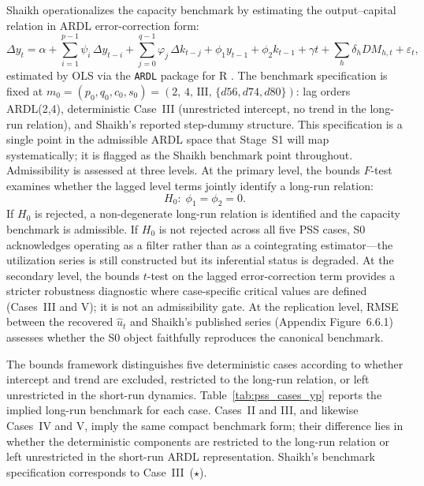 \documentclass[11pt,a4paper]{article}
\begin{document}

Shaikh operationalizes the capacity benchmark by estimating the
output--capital relation in ARDL error-correction form:
%
\begin{equation}
	\label{eq:S0_ecm}
	\Delta y_t
	=
	\alpha
	+ \sum_{i=1}^{p-1} \psi_i\,\Delta y_{t-i}
	+ \sum_{j=0}^{q-1} \varphi_j\,\Delta k_{t-j}
	+ \phi_1 y_{t-1}
	+ \phi_2 k_{t-1}
	+ \gamma t
	+ \sum_h \delta_h DM_{h,t}
	+ \varepsilon_t,
\end{equation}
%
estimated by OLS via the \texttt{ARDL} package for \textsf{R}
\citep{Natsiopoulos2024}. The benchmark specification is fixed at
$m_0 = (p_0, q_0, c_0, s_0) = (2,\, 4,\, \text{III},\, \{d56, d74, d80\})$:
lag orders ARDL(2,4), deterministic Case~III (unrestricted intercept, no
trend in the long-run relation), and Shaikh's reported step-dummy structure.
This specification is a single point in the admissible ARDL space that
Stage~S1 will map systematically; it is flagged as the Shaikh benchmark
point throughout. Admissibility is assessed at three levels. At the primary
level, the bounds $F$-test examines whether the lagged level terms jointly
identify a long-run relation:
%
\begin{equation}
	\label{eq:S0_admissibility}
	H_0:\; \phi_1 = \phi_2 = 0.
\end{equation}
%
If $H_0$ is rejected, a non-degenerate long-run relation is identified and
the capacity benchmark is admissible. If $H_0$ is not rejected across all
five PSS cases, S0 acknowledges operating as a filter rather than as a
cointegrating estimator---the utilization series is still constructed but
its inferential status is degraded. At the secondary level, the bounds
$t$-test on the lagged error-correction term provides a stricter robustness
diagnostic where case-specific critical values are defined (Cases~III and
V); it is not an admissibility gate. At the replication level, RMSE
between the recovered $\widehat{u}_t$ and Shaikh's published series
(Appendix Figure~6.6.1) assesses whether the S0 object faithfully
reproduces the canonical benchmark.


The bounds framework distinguishes five deterministic cases according to
whether intercept and trend are excluded, restricted to the long-run
relation, or left unrestricted in the short-run dynamics. Table~\ref{tab:pss_cases_yp}
reports the implied long-run benchmark for each case. Cases~II and III,
and likewise Cases~IV and V, imply the same compact benchmark form; their
difference lies in whether the deterministic components are restricted to
the long-run relation or left unrestricted in the short-run ARDL
representation. Shaikh's benchmark specification corresponds to
Case~III~($\star$).
\end{document}

